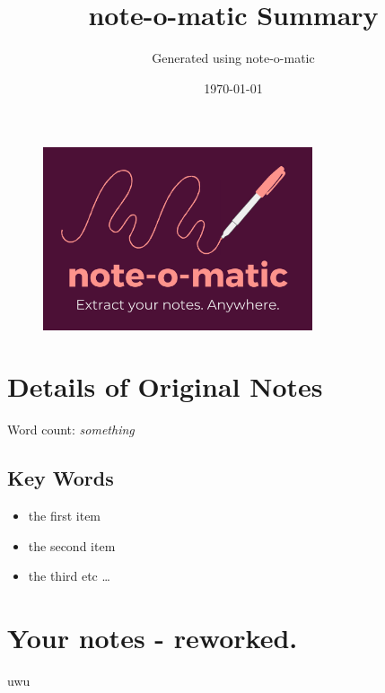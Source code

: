 \documentclass{article}%
\title{note{-}o{-}matic Summary}%
\author{Generated using note{-}o{-}matic}%
\date{\today}%
\begin{document}
%
\normalsize%


\begin{figure}[h!]%
\centering%
\includegraphics[width=300px]{final.png}%
\end{figure}

%
\maketitle%
\section{Details of Original Notes}%
\label{sec:DetailsofOriginalNotes}%
Word count: %
\textit{something}%
\subsection{Key Words}%
\label{subsec:KeyWords}%
\begin{itemize}%
\item%
the first item%
\item%
the second item%
\item%
the third etc%
\ldots%
\end{itemize}

%
\section{Your notes {-} reworked.}%
\label{sec:Yournotes{-}reworked.}%
uwu

%
\end{document}
